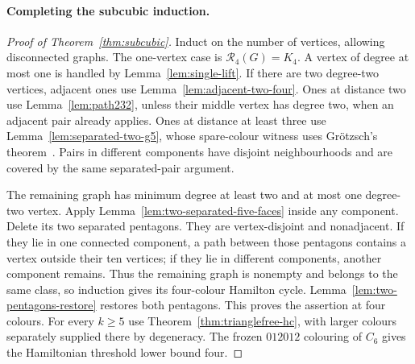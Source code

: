\documentclass[11pt]{article}
\theoremstyle{remark}
\newcommand{\R}{\mathcal R}
\numberwithin{equation}{section}
\numberwithin{table}{section}
\begin{document}
\paragraph{Completing the subcubic induction.}
\begin{proof}[Proof of Theorem~\ref{thm:subcubic}]
Induct on the number of vertices, allowing disconnected graphs.
The one-vertex case is $\R_4(G)=K_4$. A vertex of degree at most one
is handled by Lemma~\ref{lem:single-lift}.
If there are two degree-two vertices, adjacent ones use Lemma~\ref{lem:adjacent-two-four}. Ones at distance two use Lemma~\ref{lem:path232}, unless their
middle vertex has degree two, when an adjacent pair already applies.
Ones at distance at least three use Lemma~\ref{lem:separated-two-g5}, whose spare-colour witness uses
Gr\"otzsch's theorem~\cite{Grotzsch59}.
Pairs in different components have disjoint neighbourhoods and
are covered by the same separated-pair argument.

The remaining graph has minimum degree at least two and at most
one degree-two vertex. Apply Lemma~\ref{lem:two-separated-five-faces}
inside any component. Delete its two separated pentagons.  They are vertex-disjoint and
nonadjacent.  If they lie in one connected component, a path between
those pentagons contains a vertex outside their ten vertices; if they lie
in different components, another component remains.  Thus the remaining
graph is nonempty and belongs to the same class, so induction gives its
four-colour Hamilton cycle.
Lemma~\ref{lem:two-pentagons-restore} restores both pentagons.
This proves the assertion at four colours.
For every $k\ge5$ use Theorem~\ref{thm:trianglefree-hc},
with larger colours separately supplied there by degeneracy.
The frozen $012012$ colouring of $C_6$ gives the Hamiltonian
threshold lower bound four.
\end{proof}
\end{document}
